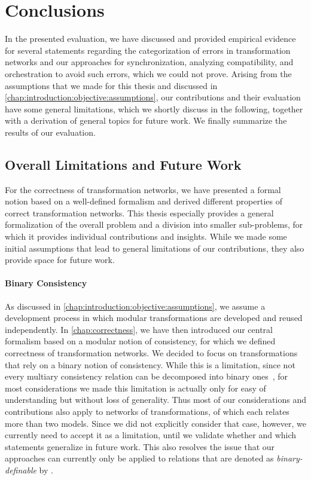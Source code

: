 \section{Conclusions}

In the presented evaluation, we have discussed and provided empirical evidence for several statements regarding the categorization of errors in transformation networks and our approaches for synchronization, analyzing compatibility, and orchestration to avoid such errors, which we could not prove.
Arising from the assumptions that we made for this thesis and discussed in \autoref{chap:introduction:objective:assumptions}, our contributions and their evaluation have some general limitations, which we shortly discuss in the following, together with a derivation of general topics for future work.
We finally summarize the results of our evaluation.


\subsection{Overall Limitations and Future Work}

For the correctness of transformation networks, we have presented a formal notion based on a well-defined formalism and derived different properties of correct transformation networks.
This thesis especially provides a general formalization of the overall problem and a division into smaller sub-problems, for which it provides individual contributions and insights.
While we made some initial assumptions that lead to general limitations of our contributions, they also provide space for future work.

\paragraph{Binary Consistency}
As discussed in \autoref{chap:introduction:objective:assumptions}, we assume a development process in which modular transformations are developed and reused independently.
In \autoref{chap:correctness}, we have then introduced our central formalism based on a modular notion of consistency, for which we defined correctness of transformation networks.
We decided to focus on transformations that rely on a binary notion of consistency.
While this is a limitation, since not every multiary consistency relation can be decomposed into binary ones~\cite{stevens2020BidirectionalTransformationLarge-SoSym}, for most considerations we made this limitation is actually only for easy of understanding but without loss of generality.
Thus most of our considerations and contributions also apply to networks of transformations, of which each relates more than two models.
Since we did not explicitly consider that case, however, we currently need to accept it as a limitation, until we validate whether and which statements generalize in future work.
This also resolves the issue that our approaches can currently only be applied to relations that are denoted as \emph{binary-definable} by \textcite{stevens2020BidirectionalTransformationLarge-SoSym}.

